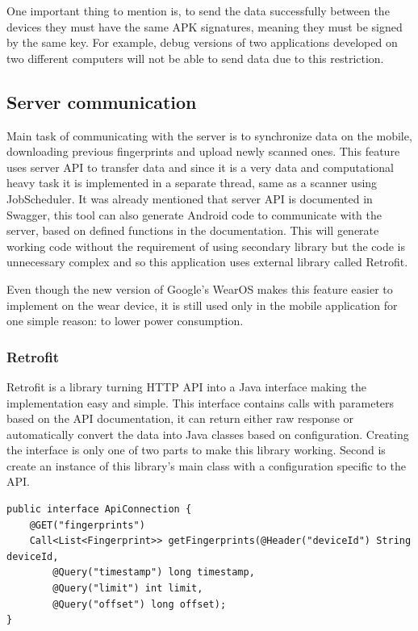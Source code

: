 One important thing to mention is, to send the data successfully between the devices they must have the same APK signatures, meaning they must be signed by the same key. For example, debug versions of two applications developed on two different computers will not be able to send data due to this restriction.

\subsection{Server communication}\label{subsec:ServerCommunication}
Main task of communicating with the server is to synchronize data on the mobile, downloading previous fingerprints and upload newly scanned ones. This feature uses server API to transfer data and since it is a very data and computational heavy task it is implemented in a separate thread, same as a scanner using JobScheduler. It was already mentioned that server API is documented in Swagger, this tool can also generate Android code to communicate with the server, based on defined functions in the documentation. This will generate working code without the requirement of using secondary library but the code is unnecessary complex and so this application uses external library called Retrofit.

Even though the new version of Google's WearOS makes this feature easier to implement on the wear device, it is still used only in the mobile application for one simple reason: to lower power consumption. 

\subsubsection{Retrofit}\label{subsec:Retrofit}
Retrofit is a library turning HTTP API into a Java interface making the implementation easy and simple. This interface contains calls with parameters based on the API documentation, it can return either raw response or automatically convert the data into Java classes based on configuration. Creating the interface is only one of two parts to make this library working. Second is create an instance of this library's main class with a configuration specific to the API.

\begin{lstlisting}[caption=Retrofit interface example]
public interface ApiConnection {
	@GET("fingerprints")
	Call<List<Fingerprint>> getFingerprints(@Header("deviceId") String deviceId,
		@Query("timestamp") long timestamp,
		@Query("limit") int limit,
		@Query("offset") long offset);
}
\end{lstlisting}

